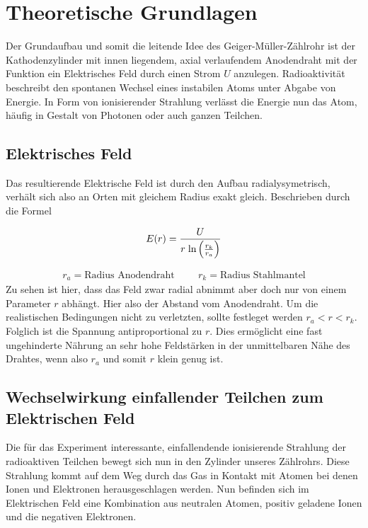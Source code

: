 \newpage
\section{Theoretische Grundlagen}
Der Grundaufbau und somit die leitende Idee des Geiger-Müller-Zählrohr ist der Kathodenzylinder %
mit innen liegendem, axial verlaufendem Anodendraht mit der Funktion ein Elektrisches Feld durch einen Strom $U$ anzulegen.
Radioaktivität beschreibt den spontanen Wechsel eines instabilen Atoms unter Abgabe von Energie. In Form von ionisierender Strahlung verlässt die Energie nun das Atom, häufig in Gestalt von Photonen oder auch ganzen Teilchen.

\subsection{Elektrisches Feld}
Das resultierende Elektrische Feld ist durch den Aufbau radialysymetrisch, verhält sich also an Orten mit gleichem Radius exakt gleich.
Beschrieben durch die Formel 

\begin{equation}  %
\label{eqn:efeld}
E(r) = \frac{U}{r \hspace{0.1cm} \text{ln} \left( \frac{r_k}{r_a} \right) }
\end{equation}

\begin{align*}
r_a = \text{Radius Anodendraht}     \hspace{1cm} r_k = \text{Radius Stahlmantel}
\end{align*}
Zu sehen ist hier, dass das Feld zwar radial abnimmt aber doch nur von einem Parameter $r$ abhängt. Hier also der Abstand vom Anodendraht.
Um die realistischen Bedingungen nicht zu verletzten, sollte festleget werden $r_a<r<r_k$.
Folglich ist die Spannung antiproportional zu $r$. Dies ermöglicht eine fast ungehinderte Nährung an sehr hohe Feldstärken in der unmittelbaren Nähe des Drahtes, wenn also $r_a$ und somit $r$ klein genug ist. 

\subsection{Wechselwirkung einfallender Teilchen zum Elektrischen Feld} %
Die für das Experiment interessante, einfallendende ionisierende Strahlung der radioaktiven Teilchen bewegt sich nun in den Zylinder unseres Zählrohrs.
Diese Strahlung kommt auf dem Weg durch das Gas in Kontakt mit Atomen bei denen Ionen und Elektronen herausgeschlagen werden. 
Nun befinden sich im Elektrischen Feld eine Kombination aus neutralen Atomen, positiv geladene Ionen und die negativen Elektronen. 


